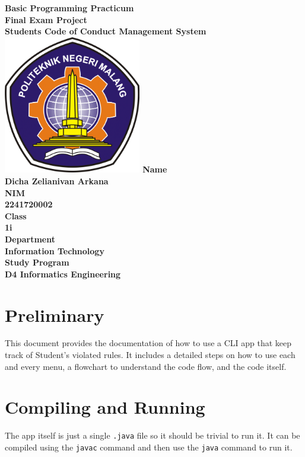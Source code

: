 \documentclass[12pt,titlepage]{article}
\newcommand{\vSubject}{Basic Programming Practicum}
\newcommand{\vSubtitle}{Final Exam Project}
\newcommand{\vName}{Dicha Zelianivan Arkana}
\newcommand{\vNIM}{2241720002}
\newcommand{\vClass}{1i}
\newcommand{\vDepartment}{Information Technology}
\newcommand{\vStudyProgram}{D4 Informatics Engineering}
\begin{document}
\begin{titlepage}
    \centering
    \vfill
    {\bfseries\LARGE
        \vSubject\\
        \vskip0.25cm
        \vSubtitle\\
    }
    \vskip0.25cm
    \bfseries\Large{Students Code of Conduct Management System}
    \vfill
    \includegraphics[width=6cm]{images/polinema-logo.png}
    \vfill
    {
        \textbf{Name}\\
        \vName\\
        \vskip0.5cm
        \textbf{NIM}\\
        \vNIM\\
        \vskip0.5cm
        \textbf{Class}\\
        \vClass\\
        \vskip0.5cm
        \textbf{Department}\\
        \vDepartment\\
        \vskip0.5cm
        \textbf{Study Program}\\
        \vStudyProgram
    }
\end{titlepage}

\tableofcontents
\pagebreak
\listoffigures
\pagebreak

\section{Preliminary}
This document provides the documentation of how to use a CLI app that keep track of Student's violated rules.
It includes a detailed steps on how to use each and every menu, a flowchart to understand the code flow, and the code itself.

\section{Compiling and Running}
The app itself is just a single \texttt{.java} file so it should be trivial to run it. It can be compiled using the \texttt{javac} command
and then use the \texttt{java} command to run it.
\end{document}
